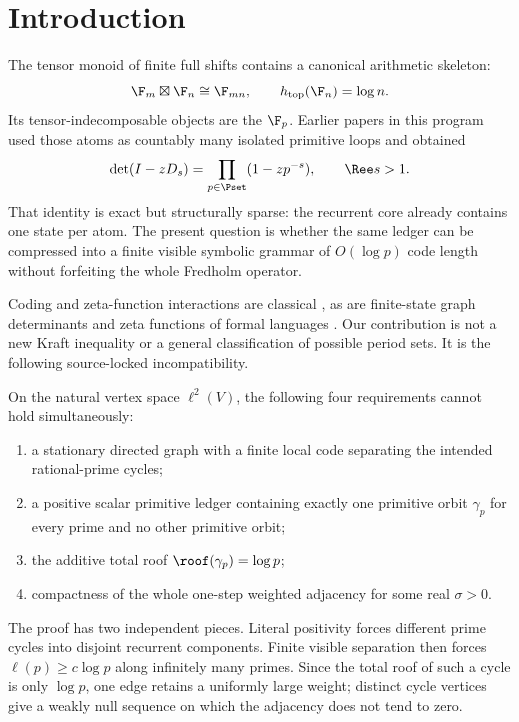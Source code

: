 \section{Introduction}

The tensor monoid of finite full shifts contains a canonical arithmetic
skeleton:
\[
  \F_m\boxtimes\F_n\cong\F_{mn},
  \qquad h_{\mathrm{top}}(\F_n)=\log n.
\]
Its tensor-indecomposable objects are the $\F_p$.  Earlier papers in this
program used those atoms as countably many isolated primitive loops and
obtained
\[
  \det(I-zD_s)=\prod_{p\in\Pset}(1-zp^{-s}),
  \qquad \Ree s>1.
\]
That identity is exact but structurally sparse: the recurrent core already
contains one state per atom.  The present question is whether the same
ledger can be compressed into a finite visible symbolic grammar of
$O(\log p)$ code length without forfeiting the whole Fredholm operator.

Coding and zeta-function interactions are classical
\citep{keller1991,bealperrin2005,hong2011,bealperrinrestivo2024}, as are
finite-state graph determinants \citep{bowenlanford1970} and zeta functions
of formal languages \citep{berstelreutenauer1990}.  Our contribution is not
a new Kraft inequality or a general classification of possible period sets.
It is the following source-locked incompatibility.

\begin{theorem}\label{thm:trilemma}
On the natural vertex space $\ell^2(V)$, the following four requirements
cannot hold simultaneously:
\begin{enumerate}[label=(\roman*)]
  \item a stationary directed graph with a finite local code separating the
        intended rational-prime cycles;
  \item a positive scalar primitive ledger containing exactly one primitive
        orbit $\gamma_p$ for every prime and no other primitive orbit;
  \item the additive total roof $\roof(\gamma_p)=\log p$;
  \item compactness of the whole one-step weighted adjacency for some real
        $\sigma>0$.
\end{enumerate}
\end{theorem}

The proof has two independent pieces.  Literal positivity forces different
prime cycles into disjoint recurrent components.  Finite visible separation
then forces $\ell(p)\ge c\log p$ along infinitely many primes.  Since the
total roof of such a cycle is only $\log p$, one edge retains a uniformly
large weight; distinct cycle vertices give a weakly null sequence on which
the adjacency does not tend to zero.

